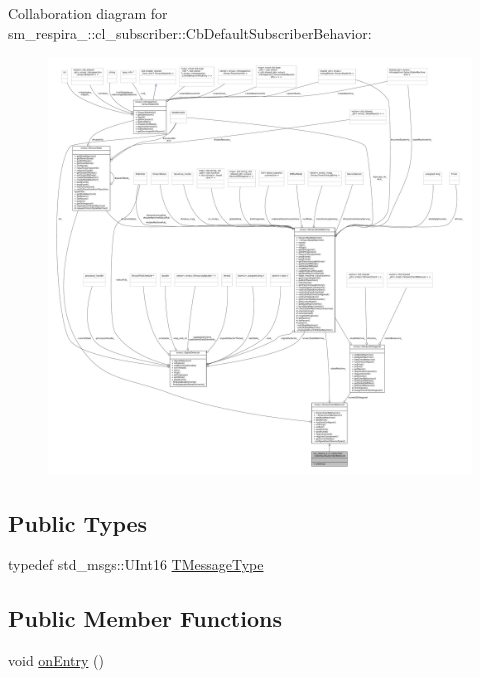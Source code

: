 Collaboration diagram for sm\+\_\+respira\+\_\+:\+:cl\+\_\+subscriber\+:\+:Cb\+Default\+Subscriber\+Behavior\+:
\nopagebreak
\begin{figure}[H]
\begin{center}
\leavevmode
\includegraphics[width=350pt]{classsm__respira__1_1_1cl__subscriber_1_1CbDefaultSubscriberBehavior__coll__graph}
\end{center}
\end{figure}
\subsection*{Public Types}
\begin{DoxyCompactItemize}
\item 
typedef std\+\_\+msgs\+::\+U\+Int16 \hyperlink{classsm__respira__1_1_1cl__subscriber_1_1CbDefaultSubscriberBehavior_a71b76903f2fdee5f359c512fea2531b3}{T\+Message\+Type}
\end{DoxyCompactItemize}
\subsection*{Public Member Functions}
\begin{DoxyCompactItemize}
\item 
void \hyperlink{classsm__respira__1_1_1cl__subscriber_1_1CbDefaultSubscriberBehavior_a7c2062f899b7fca2eb721ea4da144f62}{on\+Entry} ()
\end{DoxyCompactItemize}



